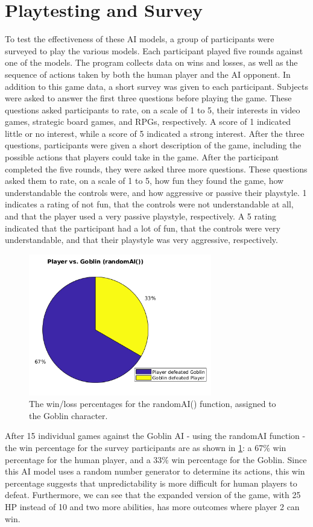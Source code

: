 \section{Playtesting and Survey}
To test the effectiveness of these AI models, a group of participants were surveyed to play the various models. Each participant played five rounds against one of the models. The program collects data on wins and losses, as well as the sequence of actions taken by both the human player and the AI opponent. In addition to this game data, a short survey was given to each participant. Subjects were asked to answer the first three questions before playing the game. These questions asked participants to rate, on a scale of 1 to 5, their interests in video games, strategic board games, and RPGs, respectively. A score of 1 indicated little or no interest, while a score of 5 indicated a strong interest. After the three questions, participants were given a short description of the game, including the possible actions that players could take in the game. After the participant completed the five rounds, they were asked three more questions. These questions asked them to rate, on a scale of 1 to 5, how fun they found the game, how understandable the controls were, and how aggressive or passive their playstyle. 1 indicates a rating of not fun, that the controls were not understandable at all, and that the player used a very passive playstyle, respectively. A 5 rating indicated that the participant had a lot of fun, that the controls were very understandable, and that their playstyle was very aggressive, respectively.\\

\begin{figure}[H]
  \centering
  \includegraphics[width=8cm]{figures/goblinWins.png}
  \caption{The win/loss percentages for the randomAI() function, assigned to the Goblin character.}
  \label{fig:pieGoblin}
\end{figure}
After 15 individual games against the Goblin AI - using the randomAI function - the win percentage for the survey participants are as shown in \ref{fig:pieGoblin}: a 67\% win percentage for the human player, and a 33\% win percentage for the Goblin. Since this AI model uses a random number generator to determine its actions, this win percentage suggests that unpredictability is more difficult for human players to defeat. Furthermore, we can see that the expanded version of the game, with 25 HP instead of 10 and two more abilities, has more outcomes where player 2 can win.\\

